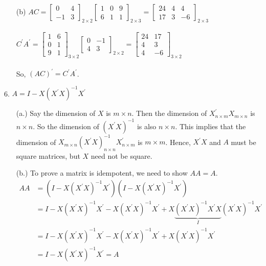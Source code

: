 \documentclass{./../../Latex/handout}
\begin{document}
\begin{itemize}
\item[(b)] \(
A C=\left[\begin{array}{cc}
0 & 4 \\
-1 & 3
\end{array}\right]_{2 \times 2}\left[\begin{array}{lll}
1 & 0 & 9 \\
6 & 1 & 1
\end{array}\right]_{2 \times 3}=\left[\begin{array}{ccc}
24 & 4 & 4 \\
17 & 3 & -6
\end{array}\right]_{2 \times 3}
\)
\\~\\
\(
C^{\prime} A^{\prime}=\left[\begin{array}{ll}
1 & 6 \\
0 & 1 \\
9 & 1
\end{array}\right]_{3 \times 2}\left[\begin{array}{cc}
0 & -1 \\
4 & 3
\end{array}\right]_{2 \times 2}=\left[\begin{array}{cc}
24 & 17 \\
4 & 3 \\
4 & -6
\end{array}\right]_{3 \times 2}
\) \\~\\
So, $(AC)^{\prime}=C^{\prime} A^{\prime}$.
\end{itemize}

6. \( A=I-X\left(X^{\prime} X\right)^{-1} X^{\prime} \) 

\begin{itemize}

\item[(a.)] Say the dimension of $X$ is \( m \times n \). Then the dimension of \( X_{n \times m}^{\prime} X_{m \times n} \) is \( n \times n \). So the dimension of \( \left(X^{\prime} X\right)^{-1} \) is also  \( n \times n \).  This implies that the dimension of \( X_{m \times n}\left(X^{\prime} X\right)_{n \times n}^{-1} X_{n \times m}^{\prime} \) is \( m \times m \). Hence, \( X^{\prime} X \) and $A$ must be square matrices, but $X$ need not be square.

\item[(b.)] To prove a matrix is idempotent, we need to show $AA=A$.
$$
\begin{aligned}
A A &= (I-X\left(X^{\prime} X\right)^{-1} X^{\prime})(I-X\left(X^{\prime} X\right)^{-1} X^{\prime}) \\
& = I-X\left(X^{\prime} X\right)^{-1} X^{\prime}-X\left(X^{\prime} X\right)^{-1} X^{\prime}+X\underbrace{\left(X^{\prime} X\right)^{-1} X^{\prime} X}_{I}\left(X^{\prime} X\right)^{-1} X^{\prime} \\
&= I-X\left(X^{\prime} X\right)^{-1} X^{\prime}-X\left(X^{\prime} X\right)^{-1} X^{\prime}+X\left(X^{\prime} X\right)^{-1} X^{\prime} \\ 
&=I-X\left(X^{\prime} X\right)^{-1} X^{\prime} = A
\end{aligned}
$$
\end{itemize}
\end{document}
